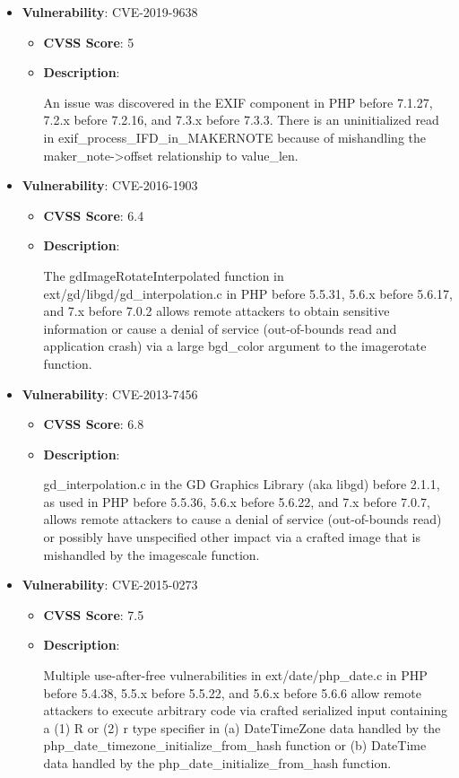 \documentclass{article}
\begin{document}
\begin{itemize}
        \item \textbf{Vulnerability}: CVE-2019-9638
        \begin{itemize}
            \item \textbf{CVSS Score}:  5 
            \item \textbf{Description}:
            \parbox[t]{0.9\linewidth}{
                \ttfamily An issue was discovered in the EXIF component in PHP before 7.1.27, 7.2.x before 7.2.16, and 7.3.x before 7.3.3. There is an uninitialized read in exif\_process\_IFD\_in\_MAKERNOTE because of mishandling the maker\_note->offset relationship to value\_len.
            }
        \end{itemize}
    
        \item \textbf{Vulnerability}: CVE-2016-1903
        \begin{itemize}
            \item \textbf{CVSS Score}:  6.4 
            \item \textbf{Description}:
            \parbox[t]{0.9\linewidth}{
                \ttfamily The gdImageRotateInterpolated function in ext/gd/libgd/gd\_interpolation.c in PHP before 5.5.31, 5.6.x before 5.6.17, and 7.x before 7.0.2 allows remote attackers to obtain sensitive information or cause a denial of service (out-of-bounds read and application crash) via a large bgd\_color argument to the imagerotate function.
            }
        \end{itemize}
    
        \item \textbf{Vulnerability}: CVE-2013-7456
        \begin{itemize}
            \item \textbf{CVSS Score}:  6.8 
            \item \textbf{Description}:
            \parbox[t]{0.9\linewidth}{
                \ttfamily gd\_interpolation.c in the GD Graphics Library (aka libgd) before 2.1.1, as used in PHP before 5.5.36, 5.6.x before 5.6.22, and 7.x before 7.0.7, allows remote attackers to cause a denial of service (out-of-bounds read) or possibly have unspecified other impact via a crafted image that is mishandled by the imagescale function.
            }
        \end{itemize}
    
        \item \textbf{Vulnerability}: CVE-2015-0273
        \begin{itemize}
            \item \textbf{CVSS Score}:  7.5 
            \item \textbf{Description}:
            \parbox[t]{0.9\linewidth}{
                \ttfamily Multiple use-after-free vulnerabilities in ext/date/php\_date.c in PHP before 5.4.38, 5.5.x before 5.5.22, and 5.6.x before 5.6.6 allow remote attackers to execute arbitrary code via crafted serialized input containing a (1) R or (2) r type specifier in (a) DateTimeZone data handled by the php\_date\_timezone\_initialize\_from\_hash function or (b) DateTime data handled by the php\_date\_initialize\_from\_hash function.
            }
        \end{itemize}
    

\end{itemize}
\end{document}
